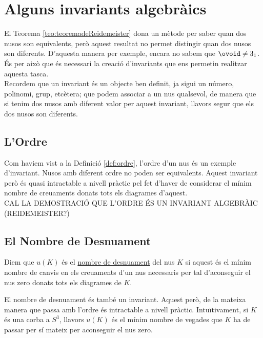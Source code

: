 
\section{Alguns invariants algebràics}\label{sec:Invariantsalgebraics}

El Teorema \ref{teo:teoremadeReidemeister} dona un mètode per saber quan dos nusos son equivalents, però aquest resultat no permet distingir quan dos nusos son diferents. D'aquesta manera per exemple, encara no sabem que $\ovoid\neq 3_1$. És per això que és necessari la creació d'invariants que ens permetin realitzar aquesta tasca.\\

Recordem que un invariant és un objecte ben definit, ja sigui un número, polinomi, grup, etcètera; que podem associar a un nus qualsevol, de manera que si tenim dos nusos amb diferent valor per aquest invariant, llavors segur que els dos nusos son diferents.

\subsection{L'Ordre}\label{sec:ordrecomainvariant}

Com haviem vist a la Definició \ref{def:ordre}, l'ordre d'un nus és un exemple d'invariant. Nusos amb diferent ordre no poden ser equivalents. Aquest invariant però és quasi intractable a nivell pràctic pel fet d'haver de considerar el mínim nombre de creuaments donats tots els diagrames d'aquest.\\

CAL LA DEMOSTRACIÓ QUE L'ORDRE ÉS UN INVARIANT ALGEBRÀIC (REIDEMEISTER?)

\subsection{El Nombre de Desnuament}\label{sec:desnuamentcomainvariant}

\begin{definition}\label{def:desnuament}
	Diem que $u(K)$ és el \underline{nombre de desnuament} del nus $K$ si aquest és el mínim nombre de canvis en els creuaments d'un nus necessaris per tal d'aconseguir el nus zero donats tots els diagrames de $K$.
\end{definition}

El nombre de desnuament és també un invariant. Aquest però, de la mateixa manera que passa amb l'ordre és intractable a nivell pràctic. Intuïtivament, si $K$ és una corba a $S^3$, llavors $u(K)$ és el mínim nombre de vegades que $K$ ha de passar per sí mateix per aconseguir el nus zero.

